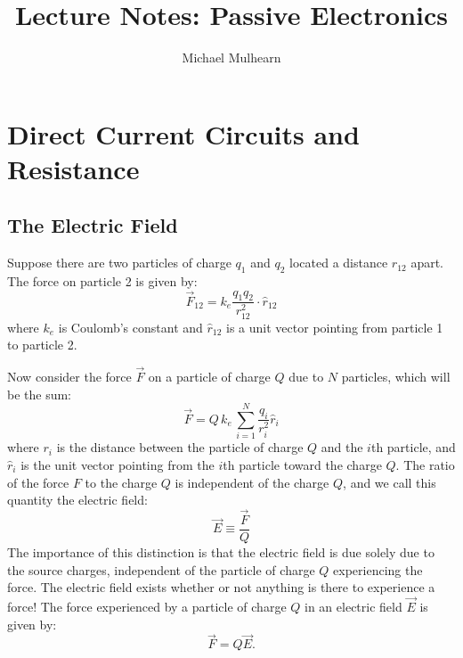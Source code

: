 \documentclass[12pt,oneside]{book}
\begin{document}

\title{Lecture Notes:  Passive Electronics}
\author{Michael Mulhearn}
\maketitle

\chapter{Direct Current Circuits and Resistance}

\section{The Electric Field}

Suppose there are two particles of charge $q_1$ and $q_2$ located a distance $r_{12}$ apart.
The force on particle 2 is given by:
\begin{displaymath}
\vec{F}_{12} = k_e \frac{q_1 q_2}{r_{12}^2} \cdot \hat{r}_{12}
\end{displaymath}
where $k_e$ is Coulomb's constant and $\hat{r}_{12}$ is a unit vector pointing from particle 1 to particle 2.

Now consider the force $\vec{F}$ on a particle of charge $Q$ due to $N$ particles, which will be the sum:
\begin{displaymath}
\vec{F} = Q \, k_e \, \sum_{i=1}^N \frac{q_i}{r_{i}^2} \hat{r}_{i}
\end{displaymath}
where $r_i$ is the distance between the particle of charge $Q$ and the $i$th particle, and $\hat{r}_i$ is the unit vector pointing from the $i$th particle toward the charge $Q$.  The ratio of the force $F$ to the charge $Q$ is independent of the charge $Q$, and we call this quantity the electric field:
\begin{displaymath}
\vec{E} \equiv \frac{\vec{F}}{Q}
\end{displaymath}
The importance of this distinction is that the electric field is due solely due to the source charges, independent of the particle of charge $Q$ experiencing the force.  The electric field exists whether or not anything is there to experience a force!  The force experienced by a particle of charge $Q$ in an electric field $\vec{E}$ is given by:
\begin{displaymath}
\vec{F} = Q \vec{E}.
\end{displaymath}
\end{document}
